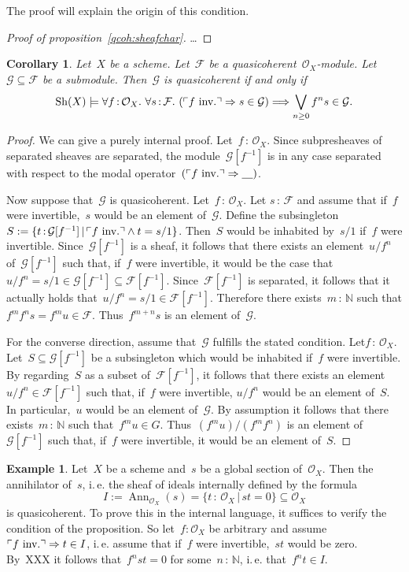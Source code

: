 \documentclass[10pt]{amsart}
\theoremstyle{definition}
\newtheorem{ex}[defn]{Example}
\theoremstyle{plain}
\newtheorem{cor}[defn]{Corollary}
\theoremstyle{remark}
\newcommand{\F}{\mathcal{F}}
\newcommand{\G}{\mathcal{G}}
\renewcommand{\O}{\mathcal{O}}
\newcommand{\NN}{\mathbb{N}}
\newcommand{\placeholder}{\underline{\quad}}
\newcommand{\Sh}{\mathrm{Sh}}
\DeclareMathOperator{\Ann}{Ann}
\newcommand{\?}{\,{:}\,}
\renewcommand{\_}{\mathpunct{.}\,}
\newcommand{\speak}[1]{\ulcorner\text{\textnormal{#1}}\urcorner}
\begin{document}
The proof will explain the origin of this condition.

\begin{proof}[Proof of proposition~\ref{qcoh:sheafchar}]\ldots\end{proof}

\begin{cor}Let~$X$ be a scheme. Let~$\F$ be a quasicoherent~$\O_X$-module.
Let~$\G \subseteq \F$ be a submodule. Then~$\G$ is quasicoherent if and only
if
\[ \Sh(X) \models \forall f\?\O_X\_
  \forall s\?\F\_
  (\speak{$f$ inv.} \Rightarrow s \in \G) \Longrightarrow
  \bigvee_{n \geq 0} f^n s \in \G. \]
\end{cor}
\begin{proof}We can give a purely internal proof. Let~$f\?\O_X$.
Since subpresheaves of separated sheaves are separated, the module~$\G[f^{-1}]$
is in any case separated with respect to the modal operator~$(\speak{$f$ inv.}
\Rightarrow \placeholder)$.

Now suppose that~$\G$ is quasicoherent. Let~$f\?\O_X$. Let $s\?\F$ and assume that
if~$f$ were invertible,~$s$ would be an element of~$\G$. Define the
subsingleton~$S := \{ t\?\G[f^{-1}] \,|\, \speak{$f$ inv.} \wedge t=s/1 \}$.
Then~$S$ would be inhabited by~$s/1$ if~$f$ were invertible. Since~$\G[f^{-1}]$
is a sheaf, it follows that there exists an element~$u/f^n$ of~$\G[f^{-1}]$
such that, if~$f$ were invertible, it would be the case that~$u/f^n = s/1 \in
\G[f^{-1}] \subseteq \F[f^{-1}]$.
Since~$\F[f^{-1}]$ is separated, it follows that it actually holds that~$u/f^n
= s/1 \in \F[f^{-1}]$. Therefore there exists~$m\?\NN$ such that $f^m f^n s =
f^m u \in \F$. Thus~$f^{m+n} s$ is an element of~$\G$.

For the converse direction, assume that~$\G$ fulfills the stated condition.
Let$f\?\O_X$. Let~$S \subseteq \G[f^{-1}]$ be a subsingleton which would be
inhabited if~$f$ were invertible. By regarding~$S$ as a subset of~$\F[f^{-1}]$,
it follows that there exists an element~$u/f^n \in \F[f^{-1}]$ such that,
if~$f$ were invertible, $u/f^n$ would be an element of~$S$. In particular,~$u$
would be an element of~$\G$. By assumption
it follows that there exists~$m\?\NN$ such that~$f^m u \in G$. Thus~$(f^m u) /
(f^m f^n)$ is an element of~$\G[f^{-1}]$ such that, if~$f$ were invertible, it
would be an element of~$S$.
\end{proof}

\begin{ex}Let~$X$ be a scheme and~$s$ be a global section of~$\O_X$. Then the
annihilator of~$s$, i.\,e. the sheaf of ideals internally defined by the
formula
\[ I := \Ann_{\O_X}(s) = \{ t\?\O_X \,|\, st = 0 \} \subseteq \O_X \]
is quasicoherent. To prove this in the internal language, it suffices to
verify the condition of the proposition.
So let~$f:\O_X$ be arbitrary and assume~$\speak{$f$ inv.} \Rightarrow t \in I$,
i.\,e. assume that if~$f$ were invertible,~$st$ would be zero. By~XXX it
follows that~$f^n st = 0$ for some~$n\?\NN$, i.\,e. that~$f^n t \in I$.
\end{ex}
\end{document}
